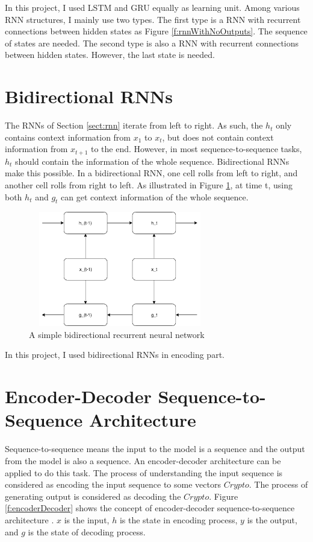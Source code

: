\documentclass[modernstyle,12pt]{sjsuthesis}
\theoremstyle{definition}
\begin{document}
In this project, I used LSTM and GRU equally as learning unit. Among various RNN structures, I mainly use two types. The first type is a RNN with recurrent connections between hidden states as Figure \ref{f:rnnWithNoOutputs}. The sequence of  states are needed. The second type is also a RNN with recurrent connections between hidden states. However, the last state is needed.

\section{Bidirectional RNNs}

The RNNs of Section \ref{sect:rnn}
iterate from left to right. As such, the $h_t$ only contains context information from $x_1$ to $x_t$, but does not contain context information from $x_{t+1}$ to the end. However, in most sequence-to-sequence tasks, $h_t$ should contain the information of the whole sequence. Bidirectional RNNs make this possible. In a bidirectional RNN, one cell rolls from left to right, and another cell rolls from right to left. As illustrated in Figure \ref{f:bidirectionalRnn}, at time t, using both $h_t$ and $g_t$ can get context information of the whole sequence.

\begin{figure}[htbp]\centering
  \includegraphics[width=8cm, height=5cm]{figures/bidirectionalRnn.png}
  \caption{A simple bidirectional recurrent neural network}
  \label{f:bidirectionalRnn}
\end{figure}

In this project, I used bidirectional RNNs in encoding part.

\section{Encoder-Decoder Sequence-to-Sequence Architecture}

Sequence-to-sequence means the input to the model is a sequence and the output from the model is also a sequence. An encoder-decoder architecture can be applied to do this task. The process of understanding the input sequence is considered as encoding the input sequence to some vectors $Crypto$. The process of generating output is considered as decoding the $Crypto$. Figure \ref{f:encoderDecoder} shows the concept of encoder-decoder sequence-to-sequence architecture . $x$ is the input, $h$ is the state in encoding process, $y$ is the output, and $g$ is the state of decoding process.
\end{document}
